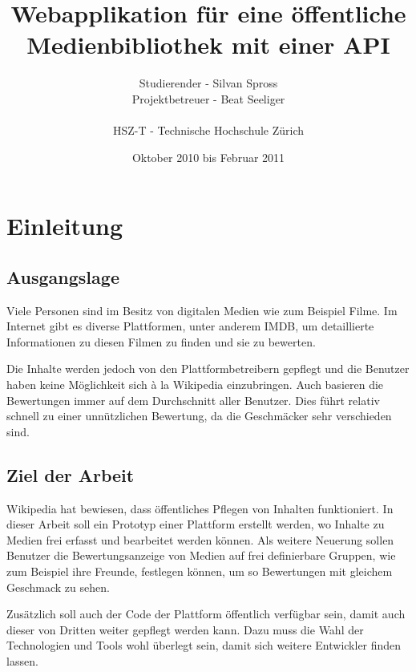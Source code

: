 \documentclass[abstracton,liststotoc,bibtotoc]{scrreprt}
\title{Webapplikation für eine öffentliche Medienbibliothek mit einer API}
\author{Studierender - Silvan Spross\\
    Projektbetreuer - Beat Seeliger\\
    \\
    HSZ-T - Technische Hochschule Zürich}
\date{Oktober 2010 bis Februar 2011}
\begin{document}
    \ifpdf
    \else
    \fi

    \maketitle
    
    
    \begin{abstract}
        
    \end{abstract}

    \tableofcontents
    

    \chapter{Einleitung}
    \section{Ausgangslage}
    Viele Personen sind im Besitz von digitalen Medien wie zum Beispiel Filme.
    Im Internet gibt es diverse Plattformen, unter anderem IMDB, um 
    detaillierte Informationen zu diesen Filmen zu finden und sie zu bewerten. 

    Die Inhalte werden jedoch von den Plattformbetreibern gepflegt und die 
    Benutzer haben keine Möglichkeit sich à la Wikipedia einzubringen. Auch 
    basieren die Bewertungen immer auf dem Durchschnitt aller Benutzer. Dies
    führt relativ schnell zu einer unnützlichen Bewertung, da die Geschmäcker
    sehr verschieden sind.
    
    \section{Ziel der Arbeit}
    Wikipedia hat bewiesen, dass öffentliches Pflegen von Inhalten 
    funktioniert. In dieser Arbeit soll ein Prototyp einer Plattform erstellt
    werden, wo Inhalte zu Medien frei erfasst und bearbeitet werden können.
    Als weitere Neuerung sollen Benutzer die Bewertungsanzeige von Medien auf
    frei definierbare Gruppen, wie zum Beispiel ihre Freunde, festlegen 
    können, um so Bewertungen mit gleichem Geschmack zu sehen.

    Zusätzlich soll auch der Code der Plattform öffentlich verfügbar sein, 
    damit auch dieser von Dritten weiter gepflegt werden kann. Dazu muss die 
    Wahl der Technologien und Tools wohl überlegt sein, damit sich weitere 
    Entwickler finden lassen.
    
\end{document}
